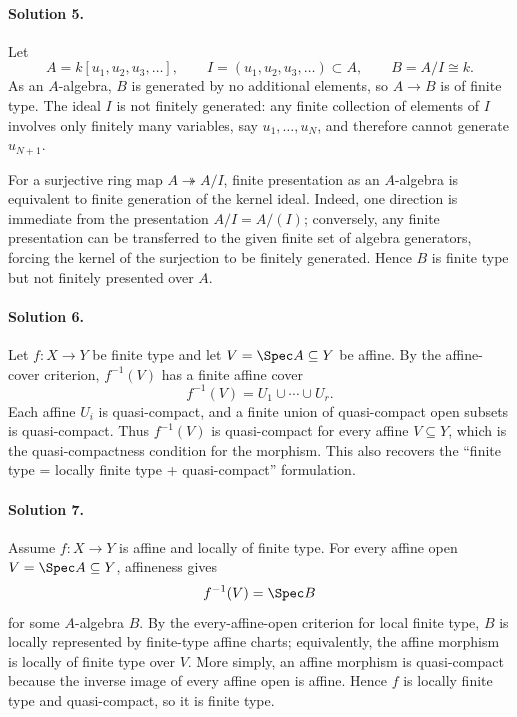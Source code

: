 \paragraph{Solution 5.}
Let
\[
A=k[u_1,u_2,u_3,\ldots],
\qquad
I=(u_1,u_2,u_3,\ldots)\subset A,
\qquad
B=A/I\cong k.
\]
As an \(A\)-algebra, \(B\) is generated by no additional elements, so \(A\to B\) is of finite type.
The ideal \(I\) is not finitely generated: any finite collection of elements of \(I\) involves only
finitely many variables, say \(u_1,\ldots,u_N\), and therefore cannot generate \(u_{N+1}\).

For a surjective ring map \(A\twoheadrightarrow A/I\), finite presentation as an \(A\)-algebra is
equivalent to finite generation of the kernel ideal.  Indeed, one direction is immediate from the
presentation \(A/I=A/(I)\); conversely, any finite presentation can be transferred to the given
finite set of algebra generators, forcing the kernel of the surjection to be finitely generated.
Hence \(B\) is finite type but not finitely presented over \(A\).

\paragraph{Solution 6.}
Let \(f:X\to Y\) be finite type and let \(V=\Spec A\subseteq Y\) be affine.  By the affine-cover
criterion, \(f^{-1}(V)\) has a finite affine cover
\[
f^{-1}(V)=U_1\cup\cdots\cup U_r.
\]
Each affine \(U_i\) is quasi-compact, and a finite union of quasi-compact open subsets is
quasi-compact.  Thus \(f^{-1}(V)\) is quasi-compact for every affine \(V\subseteq Y\), which is the
quasi-compactness condition for the morphism.  This also recovers the ``finite type = locally finite
type + quasi-compact'' formulation.

\paragraph{Solution 7.}
Assume \(f:X\to Y\) is affine and locally of finite type.  For every affine open
\(V=\Spec A\subseteq Y\), affineness gives
\[
f^{-1}(V)=\Spec B
\]
for some \(A\)-algebra \(B\).  By the every-affine-open criterion for local finite type, \(B\) is
locally represented by finite-type affine charts; equivalently, the affine morphism is locally of
finite type over \(V\).  More simply, an affine morphism is quasi-compact because the inverse image
of every affine open is affine.  Hence \(f\) is locally finite type and quasi-compact, so it is
finite type.

